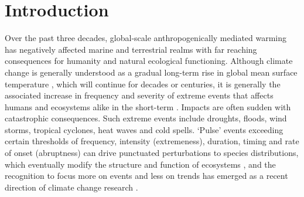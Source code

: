 \documentclass[a4paper,10pt,review]{elsarticle}
\begin{document}
\linenumbers

\section{Introduction}

Over the past three decades, global-scale anthropogenically mediated warming has negatively affected marine and terrestrial realms with far reaching consequences for humanity and natural ecological functioning.  Although climate change is generally understood as a gradual long-term rise in global mean surface temperature \cite{IPCC2014}, which will continue for decades or centuries, it is generally the associated increase in frequency and severity of extreme events that affects humans and ecosystems alike in the short-term \cite{Easterling2000}. Impacts are often sudden with catastrophic consequences. Such extreme events include droughts, floods, wind storms, tropical cyclones, heat waves and cold spells. `Pulse' events exceeding certain thresholds of frequency, intensity (extremeness), duration, timing and rate of onset (abruptness) can drive punctuated perturbations to species distributions, which eventually modify the structure and function of ecosystems \cite{Wernberg2013, Rehage2016}, and the recognition to focus more on events and less on trends has emerged as a recent direction of climate change research \cite{Jentsch2007}. 
\end{document}
